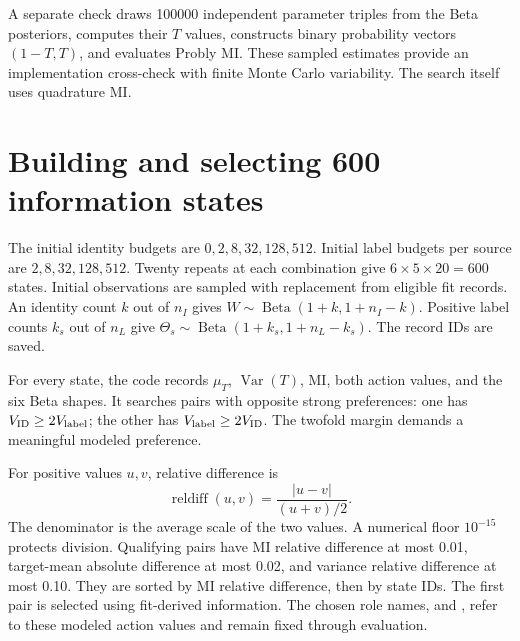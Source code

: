 \documentclass[11pt,a4paper]{report}
\newcommand{\Var}{\operatorname{Var}}
\newcommand{\Beta}{\operatorname{Beta}}
\newcommand{\code}[1]{\texttt{\detokenize{#1}}}
\begin{document}
A separate check draws 100000 independent parameter triples from the Beta posteriors, computes their $T$ values, constructs binary probability vectors $(1-T,T)$, and evaluates Probly MI. These sampled estimates provide an implementation cross-check with finite Monte Carlo variability. The search itself uses quadrature MI.

\section{Building and selecting 600 information states}
The initial identity budgets are $0,2,8,32,128,512$. Initial label budgets per source are $2,8,32,128,512$. Twenty repeats at each combination give $6\times5\times20=600$ states. Initial observations are sampled with replacement from eligible fit records. An identity count $k$ out of $n_I$ gives $W\sim\Beta(1+k,1+n_I-k)$. Positive label counts $k_s$ out of $n_L$ give $\Theta_s\sim\Beta(1+k_s,1+n_L-k_s)$. The record IDs are saved.

For every state, the code records $\mu_T$, $\Var(T)$, MI, both action values, and the six Beta shapes. It searches pairs with opposite strong preferences: one has $V_{\rm ID}\geq2V_{\rm label}$; the other has $V_{\rm label}\geq2V_{\rm ID}$. The twofold margin demands a meaningful modeled preference.

For positive values $u,v$, relative difference is
\begin{equation}
\operatorname{reldiff}(u,v)=\frac{|u-v|}{(u+v)/2}.
\end{equation}
The denominator is the average scale of the two values. A numerical floor $10^{-15}$ protects division. Qualifying pairs have MI relative difference at most 0.01, target-mean absolute difference at most 0.02, and variance relative difference at most 0.10. They are sorted by MI relative difference, then by state IDs. The first pair is selected using fit-derived information. The chosen role names, \code{identity_preferred} and \code{label_preferred}, refer to these modeled action values and remain fixed through evaluation.
\end{document}
